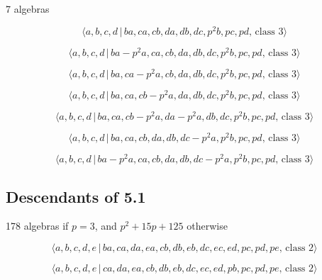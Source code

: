 \documentclass[10pt]{article}
\begin{document}
7 algebras

\begin{equation}
\langle a,b,c,d\,|\,ba,ca,cb,da,db,dc,p^2b,pc,pd,\,\text{class }3\rangle 
\tag{7.4570}
\end{equation}

\begin{equation}
\langle a,b,c,d\,|\,ba-p^2a,ca,cb,da,db,dc,p^2b,pc,pd,\,\text{class }3\rangle
\tag{7.4571}
\end{equation}

\begin{equation}
\langle a,b,c,d\,|\,ba,ca-p^2a,cb,da,db,dc,p^2b,pc,pd,\,\text{class }3\rangle
\tag{7.4572}
\end{equation}

\begin{equation}
\langle a,b,c,d\,|\,ba,ca,cb-p^2a,da,db,dc,p^2b,pc,pd,\,\text{class }3\rangle
\tag{7.4573}
\end{equation}

\begin{equation}
\langle a,b,c,d\,|\,ba,ca,cb-p^2a,da-p^2a,db,dc,p^2b,pc,pd,\,\text{class }%
3\rangle  \tag{7.4574}
\end{equation}

\begin{equation}
\langle a,b,c,d\,|\,ba,ca,cb,da,db,dc-p^2a,p^2b,pc,pd,\,\text{class }3\rangle
\tag{7.4575}
\end{equation}

\begin{equation}
\langle a,b,c,d\,|\,ba-p^2a,ca,cb,da,db,dc-p^2a,p^2b,pc,pd,\,\text{class }%
3\rangle  \tag{7.4576}
\end{equation}

\subsection{Descendants of 5.1}

178 algebras if $p=3$, and $p^{2}+15p+125$ otherwise

\begin{equation}
\langle a,b,c,d,e\,|\,ba,ca,da,ea,cb,db,eb,dc,ec,ed,pc,pd,pe,\,\text{class }%
2\rangle  \tag{7.4577}
\end{equation}

\begin{equation}
\langle a,b,c,d,e\,|\,ca,da,ea,cb,db,eb,dc,ec,ed,pb,pc,pd,pe,\,\text{class }%
2\rangle  \tag{7.4578}
\end{equation}
\end{document}
